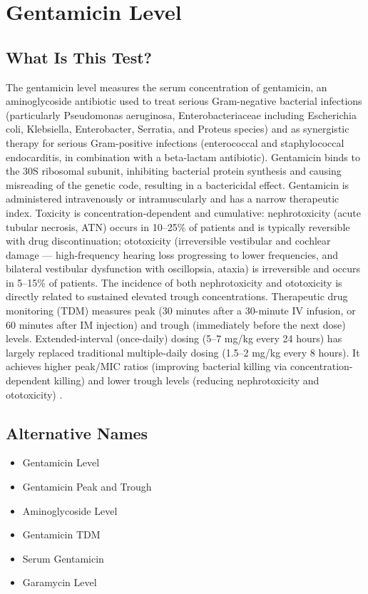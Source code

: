 \chapter{Gentamicin Level}

\section*{What Is This Test?}
The gentamicin level measures the serum concentration of gentamicin, an aminoglycoside antibiotic used to treat serious Gram-negative bacterial infections (particularly Pseudomonas aeruginosa, Enterobacteriaceae including Escherichia coli, Klebsiella, Enterobacter, Serratia, and Proteus species) and as synergistic therapy for serious Gram-positive infections (enterococcal and staphylococcal endocarditis, in combination with a beta-lactam antibiotic). Gentamicin binds to the 30S ribosomal subunit, inhibiting bacterial protein synthesis and causing misreading of the genetic code, resulting in a bactericidal effect. Gentamicin is administered intravenously or intramuscularly and has a narrow therapeutic index. Toxicity is concentration-dependent and cumulative: nephrotoxicity (acute tubular necrosis, ATN) occurs in 10--25\% of patients and is typically reversible with drug discontinuation; ototoxicity (irreversible vestibular and cochlear damage --- high-frequency hearing loss progressing to lower frequencies, and bilateral vestibular dysfunction with oscillopsia, ataxia) is irreversible and occurs in 5--15\% of patients. The incidence of both nephrotoxicity and ototoxicity is directly related to sustained elevated trough concentrations. Therapeutic drug monitoring (TDM) measures peak (30 minutes after a 30-minute IV infusion, or 60 minutes after IM injection) and trough (immediately before the next dose) levels. Extended-interval (once-daily) dosing (5--7 mg/kg every 24 hours) has largely replaced traditional multiple-daily dosing (1.5--2 mg/kg every 8 hours). It achieves higher peak/MIC ratios (improving bacterial killing via concentration-dependent killing) and lower trough levels (reducing nephrotoxicity and ototoxicity) \cite{begg1995suggested}.

\section*{Alternative Names}
\begin{itemize}
  \item Gentamicin Level
  \item Gentamicin Peak and Trough
  \item Aminoglycoside Level
  \item Gentamicin TDM
  \item Serum Gentamicin
  \item Garamycin Level
\end{itemize}
